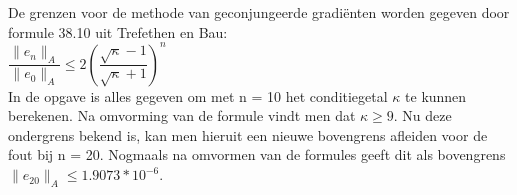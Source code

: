 De grenzen voor de methode van geconjungeerde gradiënten worden gegeven door formule 38.10 uit Trefethen en Bau:\\

$\dfrac{\|e_{n}\|_{A}}{\|e_{0}\|_{A}} \leq 2(\dfrac{\sqrt{\kappa} - 1}{\sqrt{\kappa} + 1})^{n}$\\[12pt]

In de opgave is alles gegeven om met n = 10 het conditiegetal $\kappa$ te kunnen berekenen. Na omvorming van de formule vindt men dat $\kappa \geq 9$.
Nu deze ondergrens bekend is, kan men hieruit een nieuwe bovengrens afleiden voor de fout bij n = 20. Nogmaals na omvormen van de formules geeft dit als bovengrens $\|e_{20}\|_{A} \leq 1.9073*10^{-6}$.\\
